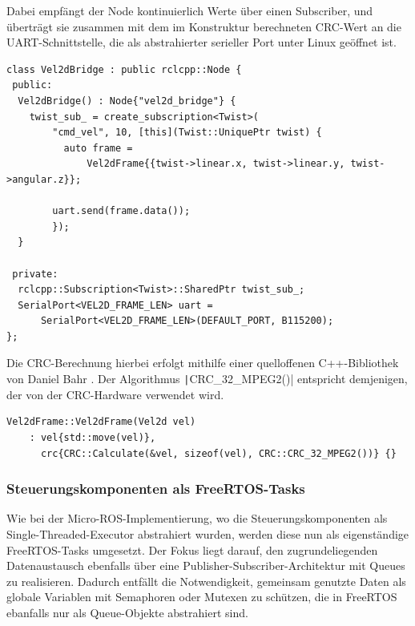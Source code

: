 Dabei empfängt der Node kontinuierlich Werte über einen Subscriber, und
überträgt sie zusammen mit dem im Konstruktur berechneten CRC-Wert an die
UART-Schnittstelle, die als abstrahierter serieller Port unter Linux geöffnet
ist.

\begin{code}
\begin{verbatim}
class Vel2dBridge : public rclcpp::Node {
 public:
  Vel2dBridge() : Node{"vel2d_bridge"} {
    twist_sub_ = create_subscription<Twist>(
        "cmd_vel", 10, [this](Twist::UniquePtr twist) {
          auto frame =
              Vel2dFrame{{twist->linear.x, twist->linear.y, twist->angular.z}};

        uart.send(frame.data());
        });
  }

 private:
  rclcpp::Subscription<Twist>::SharedPtr twist_sub_;
  SerialPort<VEL2D_FRAME_LEN> uart =
      SerialPort<VEL2D_FRAME_LEN>(DEFAULT_PORT, B115200);
};
\end{verbatim}
\end{code}

Die CRC-Berechnung hierbei erfolgt mithilfe einer quelloffenen C++-Bibliothek
von Daniel Bahr \cite{CRCpp}. Der Algorithmus \texttt|CRC_32_MPEG2()|
entspricht demjenigen, der von der CRC-Hardware verwendet wird.

\begin{code}
\begin{verbatim}
Vel2dFrame::Vel2dFrame(Vel2d vel)
    : vel{std::move(vel)},
      crc{CRC::Calculate(&vel, sizeof(vel), CRC::CRC_32_MPEG2())} {}
\end{verbatim}
\end{code}

\subsubsection{Steuerungskomponenten als FreeRTOS-Tasks}

Wie bei der Micro-ROS-Implementierung, wo die Steuerungskomponenten als
Single-Threaded-Executor abstrahiert wurden, werden diese nun als eigenständige
FreeRTOS-Tasks umgesetzt. Der Fokus liegt darauf, den zugrundeliegenden
Datenaustausch ebenfalls über eine Publisher-Subscriber-Architektur mit Queues
zu realisieren. Dadurch entfällt die Notwendigkeit, gemeinsam genutzte Daten als
globale Variablen mit Semaphoren oder Mutexen zu schützen, die in FreeRTOS
ebanfalls nur als Queue-Objekte abstrahiert sind.

